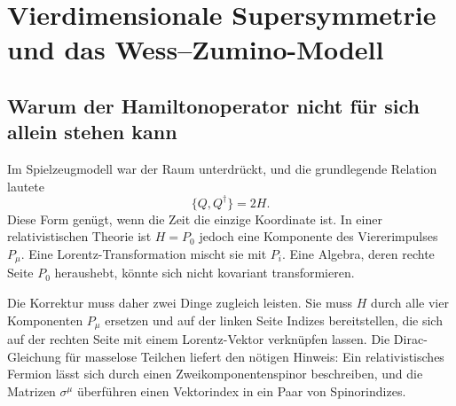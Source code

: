 \chapter{Vierdimensionale Supersymmetrie und das Wess--Zumino-Modell}


\section{Warum der Hamiltonoperator nicht für sich allein stehen kann}

Im Spielzeugmodell war der Raum unterdrückt, und die grundlegende Relation lautete
\begin{equation}
\{Q,Q^\dagger\}=2H.
\label{eq:l8-time-only-algebra}
\end{equation}
Diese Form genügt, wenn die Zeit die einzige Koordinate ist. In einer relativistischen Theorie ist \(H=P_0\) jedoch eine Komponente des Viererimpulses \(P_\mu\). Eine Lorentz-Transformation mischt sie mit \(P_i\). Eine Algebra, deren rechte Seite \(P_0\) heraushebt, könnte sich nicht kovariant transformieren.

Die Korrektur muss daher zwei Dinge zugleich leisten. Sie muss \(H\) durch alle vier Komponenten \(P_\mu\) ersetzen und auf der linken Seite Indizes bereitstellen, die sich auf der rechten Seite mit einem Lorentz-Vektor verknüpfen lassen. Die Dirac-Gleichung für masselose Teilchen liefert den nötigen Hinweis: Ein relativistisches Fermion lässt sich durch einen Zweikomponentenspinor beschreiben, und die Matrizen \(\sigma^\mu\) überführen einen Vektorindex in ein Paar von Spinorindizes.

